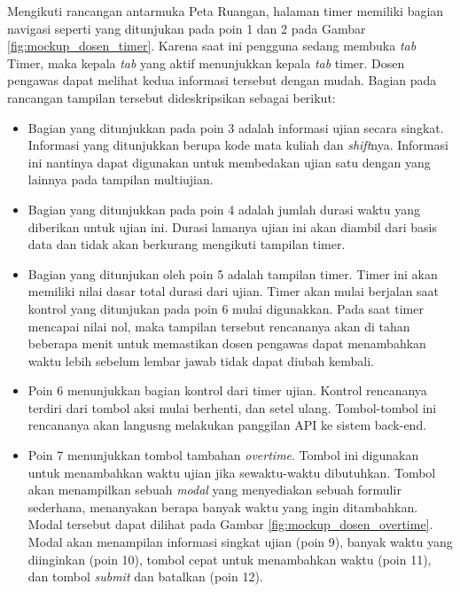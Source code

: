     Mengikuti rancangan antarmuka Peta Ruangan, halaman timer memiliki bagian
    navigasi seperti yang ditunjukan pada poin 1 dan 2 pada Gambar
    \ref{fig:mockup_dosen_timer}. Karena saat ini pengguna sedang membuka
    \textit{tab} Timer, maka kepala \textit{tab} yang aktif menunjukkan kepala
    \textit{tab} timer. Dosen pengawas dapat melihat kedua informasi tersebut
    dengan mudah. Bagian pada rancangan tampilan tersebut dideskripsikan sebagai
    berikut:
    
    \begin{itemize}
        \item Bagian yang ditunjukkan pada poin 3 adalah informasi ujian secara
            singkat. Informasi yang ditunjukkan berupa kode mata kuliah dan
            \textit{shift}nya. Informasi ini nantinya dapat digunakan untuk
            membedakan ujian satu dengan yang lainnya pada tampilan multiujian.
            
        \item Bagian yang ditunjukkan pada poin 4 adalah jumlah durasi waktu
            yang diberikan untuk ujian ini. Durasi lamanya ujian ini akan
            diambil dari basis data dan tidak akan berkurang mengikuti tampilan
            timer.
        
        \item Bagian yang ditunjukan oleh poin 5 adalah tampilan timer. Timer
            ini akan memiliki nilai dasar total durasi dari ujian. Timer akan
            mulai berjalan saat kontrol yang ditunjukan pada poin 6 mulai
            digunakkan. Pada saat timer mencapai nilai nol, maka tampilan
            tersebut rencananya akan di tahan beberapa menit untuk memastikan
            dosen pengawas dapat menambahkan waktu lebih sebelum lembar jawab
            tidak dapat diubah kembali.
        
        \item Poin 6 menunjukkan bagian kontrol dari timer ujian. Kontrol
            rencananya terdiri dari tombol aksi mulai berhenti, dan setel ulang.
            Tombol-tombol ini rencananya akan langusng melakukan panggilan API
            ke sistem back-end.
        
        \item Poin 7 menunjukkan tombol tambahan \textit{overtime}. Tombol ini
            digunakan untuk menambahkan waktu ujian jika sewaktu-waktu
            dibutuhkan. Tombol akan menampilkan sebuah \textit{modal} yang
            menyediakan sebuah formulir sederhana, menanyakan berapa banyak
            waktu yang ingin ditambahkan. Modal tersebut dapat dilihat pada
            Gambar \ref{fig:mockup_dosen_overtime}. Modal akan menampilan
            informasi singkat ujian (poin 9), banyak waktu yang diinginkan (poin
            10), tombol cepat untuk menambahkan waktu (poin 11), dan tombol
            \textit{submit} dan batalkan (poin 12).
        

\end{itemize}
